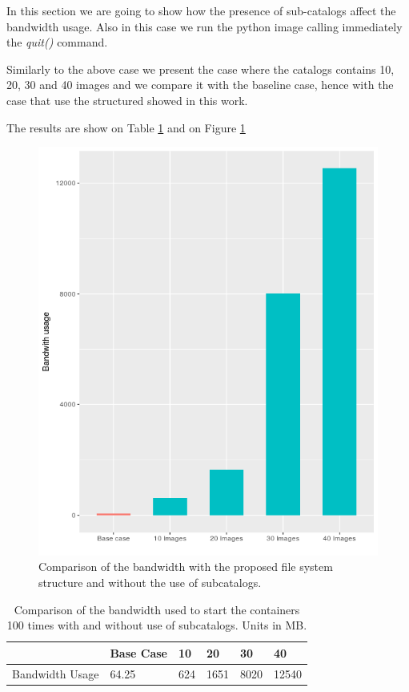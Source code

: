 In this section we are going to show how the presence of sub-catalogs affect the bandwidth usage. Also in this case we run the python image calling immediately the \textit{quit()} command.

Similarly to the above case we present the case where the catalogs contains 10, 20, 30 and 40 images and we compare it with the baseline case, hence with the case that use the structured showed in this work.

The results are show on Table \ref{tab:bandwith-catalog} and on Figure \ref{fig:bandwidth-usage}

\begin{figure}[]{}
    \includegraphics[width=\textwidth]{gfx/bandwidth-catalog}
        \caption{Comparison of the bandwidth with the proposed file system structure and without the use of subcatalogs.  }
        \label{fig:bandwidth-usage}
\end{figure}


\begin{table}[]
\begin{tabular}{|l|l|l|l|l|l|}
\hline
                & Base Case & 10  & 20   & 30   & 40    \\ \hline
Bandwidth Usage & 64.25     & 624 & 1651 & 8020 & 12540 \\ \hline
\end{tabular}
\caption{Comparison of the bandwidth used to start the containers 100 times with and without use of subcatalogs. Units in MB.}
\label{tab:bandwith-catalog}
\end{table}

